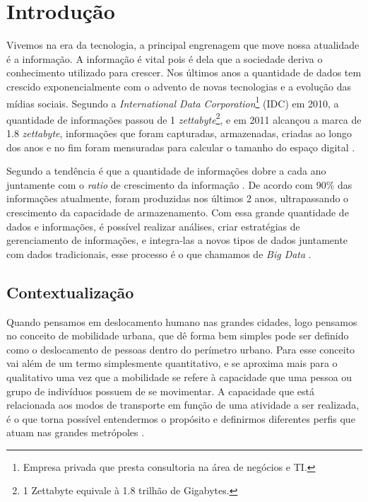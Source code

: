 \chapter[Introdução]{Introdução}

Vivemos na era da tecnologia, a principal engrenagem que move nossa atualidade é a
informação. A informação é vital pois é dela que a sociedade deriva o conhecimento
utilizado para crescer. Nos últimos anos a quantidade de dados tem crescido
exponencialmente com o advento de novas tecnologias e a evolução das mídias sociais.
Segundo a \textit{International Data Corporation}\footnote{Empresa privada que presta
consultoria na área de negócios e TI.} (IDC) em 2010, a quantidade de informações
passou de 1 \textit{zettabyte}\footnote{1 Zettabyte equivale à 1.8 trilhão de
Gigabytes.}, e em 2011 alcançou a marca de 1.8 \textit{zettabyte}, informações que
foram capturadas, armazenadas, criadas ao longo dos anos e no fim foram mensuradas
para calcular o tamanho do espaço digital \cite{gantz2011}.

Segundo  a tendência é que a quantidade de informações dobre a
cada ano juntamente com o \textit{ratio} de crescimento da informação . De acordo
com  90\% das informações atualmente, foram produzidas nos
últimos 2 anos, ultrapassando o crescimento da capacidade de armazenamento. Com
essa grande quantidade de dados e informações, é possível realizar análises, criar
estratégias de gerenciamento de informações, e integra-las a novos tipos de dados
juntamente com dados tradicionais, esse processo é o que chamamos de \textit{Big
Data} \cite{oracle2015}.

\section{Contextualização}

Quando pensamos em deslocamento humano nas grandes cidades, logo pensamos no
conceito de mobilidade urbana, que dê forma bem simples pode ser definido como o
deslocamento de pessoas dentro do perímetro urbano. Para 
esse conceito vai além de um termo simplesmente quantitativo, e se aproxima mais para
o qualitativo uma vez que a mobilidade se refere à capacidade que uma pessoa ou grupo
de indivíduos possuem de se movimentar. A capacidade que está relacionada aos modos
de transporte em função de uma atividade a ser realizada, é o que torna possível entendermos
o propósito e definirmos diferentes perfis que atuam nas grandes metrópoles \cite{pontes2011}.

